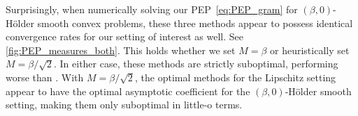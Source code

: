 \documentclass[11pt, hidelinks]{article}
\numberwithin{equation}{section}
\theoremstyle{thmstyletwo}%
\numberwithin{equation}{section}
\newcommand{\Holder}{H\"older }
\begin{document}
Surprisingly, when numerically solving our PEP~\eqref{eq:PEP_gram} for $(\beta,0)$-\Holder smooth convex problems, these three methods appear to possess identical convergence rates for our setting of interest as well. See \cref{fig:PEP_measures_both}. This holds whether we set $M=\beta$ or heuristically set $M=\beta/\sqrt{2}$. In either case, these methods are strictly suboptimal, performing worse than . With $M=\beta/\sqrt{2}$, the optimal methods for the Lipschitz setting appear to have the optimal asymptotic coefficient for the $(\beta,0)$-\Holder smooth setting, making them only suboptimal in little-o terms. 


\end{document}
